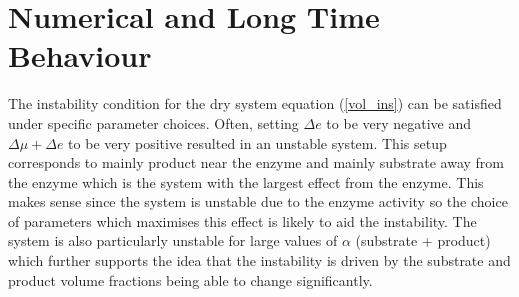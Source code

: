 \section{Numerical and Long Time Behaviour}
The instability condition for the dry system equation (\ref{vol_ins}) can be satisfied under specific parameter choices. Often, setting $\Delta e$ to be very negative and $\Delta \mu + \Delta e$ to be very positive resulted in an unstable system. This setup corresponds to mainly product near the enzyme and mainly substrate away from the enzyme which is the system with the largest effect from the enzyme. This makes sense since the system is unstable due to the enzyme activity so the choice of parameters which maximises this effect is likely to aid the instability. The system is also particularly unstable for large values of $\alpha$ (substrate + product) which further supports the idea that the instability is driven by the substrate and product volume fractions being able to change significantly.

